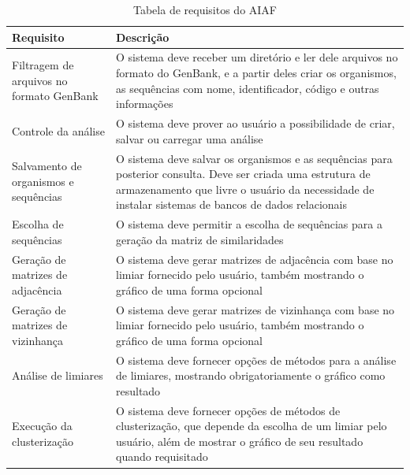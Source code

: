 \begin{table}
\centering
\caption{Tabela de requisitos do AIAF} %
\begin{tabular}{p{5cm}p{10cm}} %
\hline 
Requisito & Descrição \\ 
\hline
\hline
Filtragem de arquivos no formato GenBank & O sistema deve receber um diretório e ler dele arquivos no formato do GenBank, e a partir deles criar os
organismos, as sequências com nome, identificador, código e outras informações\\ \hline
Controle da análise & O sistema deve prover ao usuário a possibilidade de criar, salvar ou carregar uma análise \\ \hline
Salvamento de organismos e sequências & O sistema deve salvar os organismos e as sequências para posterior consulta. Deve ser criada uma estrutura de
armazenamento que livre o usuário da necessidade de instalar sistemas de bancos de dados relacionais \\ \hline
Escolha de sequências & O sistema deve permitir a escolha de sequências para a geração da matriz de similaridades \\ \hline
Geração de matrizes de adjacência & O sistema deve gerar matrizes de adjacência com base no limiar fornecido pelo usuário, também mostrando o gráfico de uma
forma opcional \\ \hline
Geração de matrizes de vizinhança & O sistema deve gerar matrizes de vizinhança com base no limiar fornecido pelo usuário, também mostrando o gráfico de uma
forma opcional \\ \hline
Análise de limiares & O sistema deve fornecer opções de métodos para a análise de limiares, mostrando obrigatoriamente o gráfico como resultado\\ \hline
Execução da clusterização & O sistema deve fornecer opções de métodos de clusterização, que depende da escolha de um limiar pelo usuário, além de mostrar
o gráfico de seu resultado quando requisitado \\ \hline

\end{tabular}
\end{table}
